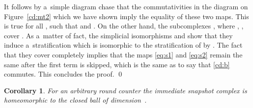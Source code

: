 \documentclass{amsart}[10pt]
\newtheorem{crl}[theorem]{Corollary}
\newcommand{\es}{\emptyset}
\newcommand{\sm}{\setminus}
\newcommand{\tr}{{\bar r}}
\numberwithin{equation}{section}
\numberwithin{figure}{section}
\numberwithin{table}{section}
\begin{document}


\label{eq:s1}

\label{eq:s2}

It follows by a~simple diagram chase that the commutativities in the
diagram on Figure~\ref{cd:mt2} which we have shown imply the equality
of these two maps. This is true for all , such that
 and . On the other hand, the
subcomplexes , where , , cover .  As a~matter of fact, the simplicial
isomorphisms  and  show that they induce
a~stratification which is isomorphic to the stratification of
 by . The fact that they cover 
completely implies that the maps \eqref{eq:s1} and \eqref{eq:s2}
remain the same after the first term is skipped, which is the same as
to say that \eqref{cd:b} commutes.  This concludes the proof.  \qed

\begin{crl}\label{crl:main}
For an arbitrary round counter  the immediate snapshot complex
  is homeomorphic to the closed ball of dimension~.
\end{crl}
\end{document}
